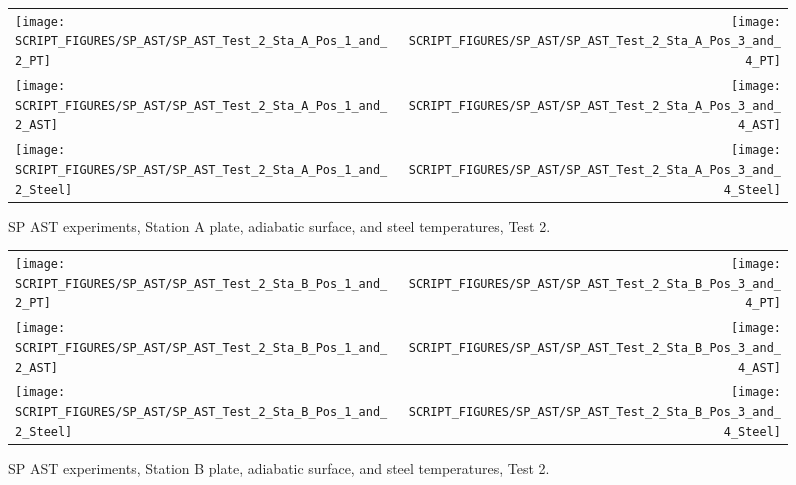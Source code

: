 \begin{figure}[p]
\begin{tabular*}{\textwidth}{l@{\extracolsep{\fill}}r}
\texttt{[image: SCRIPT\_FIGURES/SP\_AST/SP\_AST\_Test\_2\_Sta\_A\_Pos\_1\_and\_2\_PT]} &
\texttt{[image: SCRIPT\_FIGURES/SP\_AST/SP\_AST\_Test\_2\_Sta\_A\_Pos\_3\_and\_4\_PT]} \\
\texttt{[image: SCRIPT\_FIGURES/SP\_AST/SP\_AST\_Test\_2\_Sta\_A\_Pos\_1\_and\_2\_AST]} &
\texttt{[image: SCRIPT\_FIGURES/SP\_AST/SP\_AST\_Test\_2\_Sta\_A\_Pos\_3\_and\_4\_AST]} \\
\texttt{[image: SCRIPT\_FIGURES/SP\_AST/SP\_AST\_Test\_2\_Sta\_A\_Pos\_1\_and\_2\_Steel]} &
\texttt{[image: SCRIPT\_FIGURES/SP\_AST/SP\_AST\_Test\_2\_Sta\_A\_Pos\_3\_and\_4\_Steel]}
\end{tabular*}
\caption[SP AST experiments, Station A plate, adiabatic surface, and steel temperatures, Test 2]{SP AST experiments, Station A plate, adiabatic surface, and steel temperatures, Test 2.}
\label{SP_Test_2_Station_A}
\end{figure}

\begin{figure}[p]
\begin{tabular*}{\textwidth}{l@{\extracolsep{\fill}}r}
\texttt{[image: SCRIPT\_FIGURES/SP\_AST/SP\_AST\_Test\_2\_Sta\_B\_Pos\_1\_and\_2\_PT]} &
\texttt{[image: SCRIPT\_FIGURES/SP\_AST/SP\_AST\_Test\_2\_Sta\_B\_Pos\_3\_and\_4\_PT]} \\
\texttt{[image: SCRIPT\_FIGURES/SP\_AST/SP\_AST\_Test\_2\_Sta\_B\_Pos\_1\_and\_2\_AST]} &
\texttt{[image: SCRIPT\_FIGURES/SP\_AST/SP\_AST\_Test\_2\_Sta\_B\_Pos\_3\_and\_4\_AST]} \\
\texttt{[image: SCRIPT\_FIGURES/SP\_AST/SP\_AST\_Test\_2\_Sta\_B\_Pos\_1\_and\_2\_Steel]} &
\texttt{[image: SCRIPT\_FIGURES/SP\_AST/SP\_AST\_Test\_2\_Sta\_B\_Pos\_3\_and\_4\_Steel]}
\end{tabular*}
\caption[SP AST experiments, Station B plate, adiabatic surface, and steel temperatures, Test 2]{SP AST experiments, Station B plate, adiabatic surface, and steel temperatures, Test 2.}
\label{SP_Test_2_Station_B}
\end{figure}

